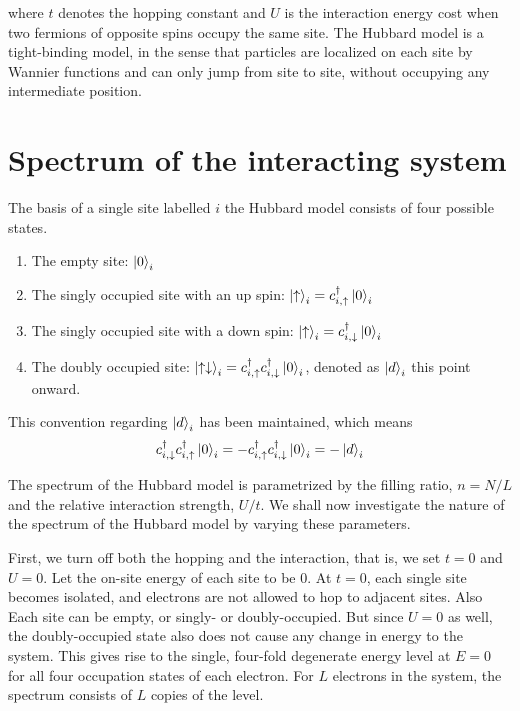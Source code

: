 \documentclass[]{report}
\begin{document}
where $ t $ denotes the hopping constant and $ U $ is the interaction energy cost when two fermions of opposite spins occupy the same site. The Hubbard model is a tight-binding model, in the sense that particles are localized on each site by Wannier functions and can only jump from site to site, without occupying any intermediate position.

\section{Spectrum of the interacting system}\label{sec:spectrum}
The basis of a single site labelled $ i $ the Hubbard model consists of four possible states.
\begin{enumerate}
	\item The empty site: $ \ket{0}_i $
	\item The singly occupied site with an up spin: $ \ket{\uparrow}_i = c^{\dagger}_{i, \uparrow} \ket{0}_i$ 
	\item The singly occupied site with a down spin: $ \ket{\uparrow}_i = c^{\dagger}_{i, \downarrow} \ket{0}_i$
	\item The doubly occupied site: $ \ket{\uparrow\downarrow}_i = c^{\dagger}_{i, \uparrow} c^{\dagger}_{i, \downarrow} \ket{0}_i $, denoted as $ \ket{d}_i $ this point onward.
\end{enumerate}

This convention regarding $ \ket{d}_i $ has been maintained, which means
\begin{align}
c^{\dagger}_{i, \downarrow} c^{\dagger}_{i, \uparrow}  \ket{0}_i  = - c^{\dagger}_{i, \uparrow} c^{\dagger}_{i, \downarrow} \ket{0}_i = -\ket{d}_i
\end{align}

The spectrum of the Hubbard model is parametrized by the filling ratio, $ n = N/L $ and the relative interaction strength, $ U/t $. We shall now investigate the nature of the spectrum of the Hubbard model by varying these parameters.

First, we turn off both the hopping and the interaction, that is, we set $ t=0 $ and $ U=0 $. Let the on-site energy of each site to be $ 0$. At $ t=0 $, each single site becomes isolated, and electrons are not allowed to hop to adjacent sites. Also Each site can be empty, or singly- or doubly-occupied. But since $ U=0 $ as well, the doubly-occupied state also does not cause any change in energy to the system. This gives rise to the single, four-fold degenerate energy level at $ E=0 $ for all four occupation states of each electron. For $ L $ electrons in the system, the spectrum consists of $ L $ copies of the level.
\end{document}
